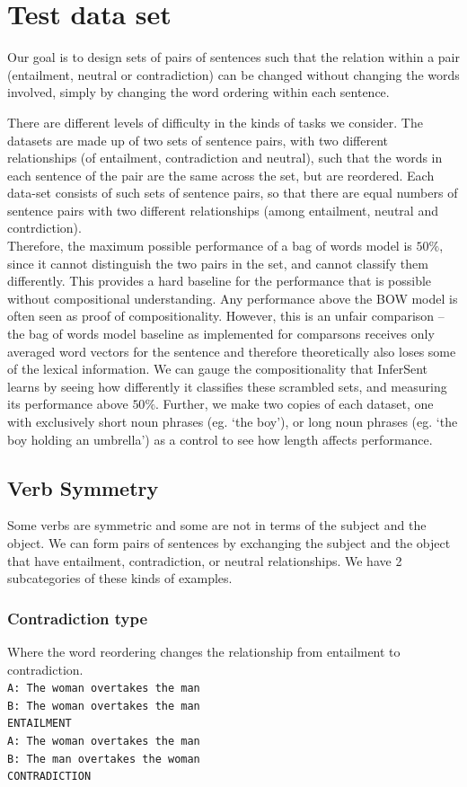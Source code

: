 \documentclass[10pt,letterpaper]{article}
\begin{document}
\section{Test data set}
Our goal is to design sets of pairs of sentences such that the relation within a pair (entailment, neutral or contradiction) can be changed without changing the words involved, simply by changing the word ordering within each sentence.

There are different levels of difficulty in the kinds of tasks we consider. The datasets are made up of two sets of sentence pairs, with two different relationships (of entailment, contradiction and neutral), such that the words in each sentence of the pair are the same across the set, but are reordered. Each data-set consists of such sets of sentence pairs, so that there are equal numbers of sentence pairs with two different relationships (among entailment, neutral and contrdiction).\\
Therefore, the maximum possible performance of a bag of words model is $50\%$, since it cannot distinguish the two pairs in the set, and cannot classify them differently. This provides a hard baseline for the performance that is possible without compositional understanding. Any performance above the BOW model is often seen as proof of compositionality. However, this is an unfair comparison – the bag of words model baseline as implemented for comparsons receives only averaged word vectors for the sentence and therefore theoretically also loses some of the lexical information.  We can gauge the compositionality that InferSent learns by seeing how differently it classifies these scrambled sets, and measuring its performance above $50\%$. Further, we make two copies of each dataset, one with exclusively short noun phrases (eg. `the boy'), or long noun phrases (eg. `the boy holding an umbrella') as a control to see how length affects performance.

\subsection{Verb Symmetry}

Some verbs are symmetric and some are not in terms of the subject and the object. We can form pairs of sentences by exchanging the subject and the object that have entailment, contradiction, or neutral relationships. We have 2 subcategories of these kinds of examples.

\subsubsection{Contradiction type}
Where the word reordering changes the relationship from entailment to contradiction.\\
{ \tt A: The woman overtakes the man \\ B: The woman overtakes the man \\ ENTAILMENT \\}{\tt A: The woman overtakes the man \\ B: The man overtakes the woman \\ CONTRADICTION }
\end{document}
